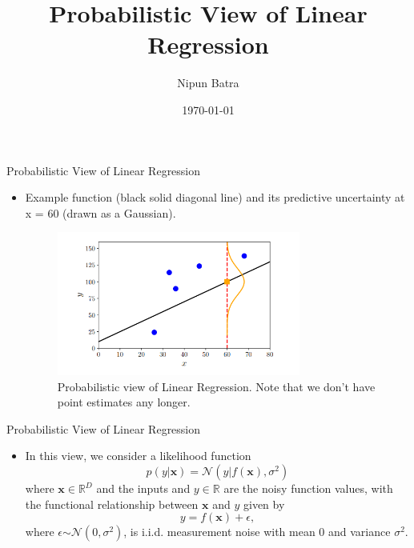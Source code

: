 \documentclass{beamer}
\title{Probabilistic View of Linear Regression}
\date{\today}
\author{Nipun Batra}
\institute{IIT Gandhinagar}
\begin{document}
\maketitle
\begin{frame}{Probabilistic View of Linear Regression}
\begin{itemize}[<+->]
\item  Example
function (black solid
diagonal line) and
its predictive
uncertainty at
x = 60 (drawn as a
Gaussian). 
    \begin{figure}[htp]
    \centering
    \includegraphics[width=8cm]{figures/probabilisticview.png}
    \caption{Probabilistic view of Linear Regression. Note that we don't have point estimates any longer.}
    \label{fig:prob1}
    \end{figure}
\end{itemize}
\end{frame}

\begin{frame}{Probabilistic View of Linear Regression}
\begin{itemize}[<+->]
\item  In this view, we consider a likelihood function
\begin{equation*}
p(y | \boldsymbol{x})=\mathcal{N}\left(y | f(\boldsymbol{x}), \sigma^{2}\right)
\end{equation*}
where $\boldsymbol{x} \in \mathbb{R}^{D}$ and the inputs and $y \in \mathbb{R}$ are the noisy function values, with the functional relationship between $\boldsymbol{x}$ and $y$ given by 
\begin{equation*}
y = f(\boldsymbol{x}) + \epsilon,
\end{equation*} where $\epsilon \stackrel{}{\sim} \mathcal{N}(0, \sigma^{2})$, is i.i.d. measurement noise with mean 0 and variance $\sigma^{2}$.

\end{itemize}
\end{frame}
\end{document}
